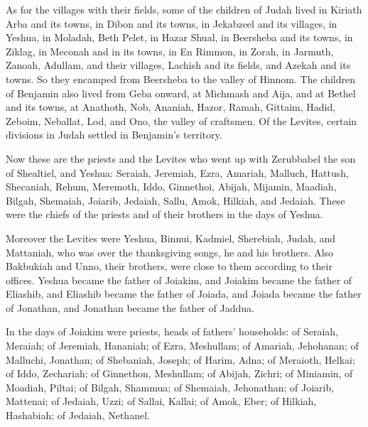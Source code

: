 \myverse{}As for the villages with their fields, some of the children
of Judah lived in Kiriath Arba and its towns, in Dibon and its towns, in Jekabzeel and its villages,
\myverse{}in Yeshua, in Moladah, Beth Pelet,
\myverse{}in Hazar Shual, in Beersheba and its towns,
\myverse{}in Ziklag, in Meconah and in its towns,
\myverse{}in En Rimmon, in Zorah, in Jarmuth,
\myverse{}Zanoah, Adullam, and their villages, Lachish and its fields, and Azekah and
its towns. So they encamped from Beersheba to the valley of Hinnom.
\myverse{}The children of Benjamin also lived from Geba onward, at Michmash and Aija,
and at Bethel and its towns,
\myverse{}at Anathoth, Nob, Ananiah,
\myverse{}Hazor, Ramah, Gittaim,
\myverse{}Hadid, Zeboim, Neballat,
\myverse{}Lod, and Ono, the valley of craftsmen.
\myverse{}Of the Levites, certain divisions in Judah settled in Benjamin’s territory.


 \myverse*{}Now these are the priests and the Levites who went up with Zerubbabel
the son of Shealtiel, and Yeshua: Seraiah, Jeremiah, Ezra,
\myverse{}Amariah, Malluch, Hattush,
\myverse{}Shecaniah, Rehum, Meremoth,
\myverse{}Iddo, Ginnethoi, Abijah,
\myverse{}Mijamin, Maadiah, Bilgah,
\myverse{}Shemaiah, Joiarib, Jedaiah,
\myverse{}Sallu, Amok, Hilkiah, and Jedaiah. These were the chiefs of the priests and
of their brothers in the days of Yeshua.

\myverse{}Moreover the Levites were Yeshua, Binnui, Kadmiel, Sherebiah,
Judah, and Mattaniah, who was over the thanksgiving songs, he and his brothers.
\myverse{}Also Bakbukiah and Unno, their brothers, were close to them according to their
offices.
\myverse{}Yeshua became the father of Joiakim, and Joiakim became the father of Eliashib,
and Eliashib became the father of Joiada,
\myverse{}and Joiada became the father of Jonathan, and Jonathan became the father
of Jaddua.

\myverse{}In the days of Joiakim were priests, heads of fathers’ households:
of Seraiah, Meraiah; of Jeremiah, Hananiah;
\myverse{}of Ezra, Meshullam; of Amariah, Jehohanan;
\myverse{}of Malluchi, Jonathan; of Shebaniah, Joseph;
\myverse{}of Harim, Adna; of Meraioth, Helkai;
\myverse{}of Iddo, Zechariah; of Ginnethon, Meshullam;
\myverse{}of Abijah, Zichri; of Miniamin, of Moadiah, Piltai;
\myverse{}of Bilgah, Shammua; of Shemaiah, Jehonathan;
\myverse{}of Joiarib, Mattenai; of Jedaiah, Uzzi;
\myverse{}of Sallai, Kallai; of Amok, Eber;
\myverse{}of Hilkiah, Hashabiah; of Jedaiah, Nethanel.

